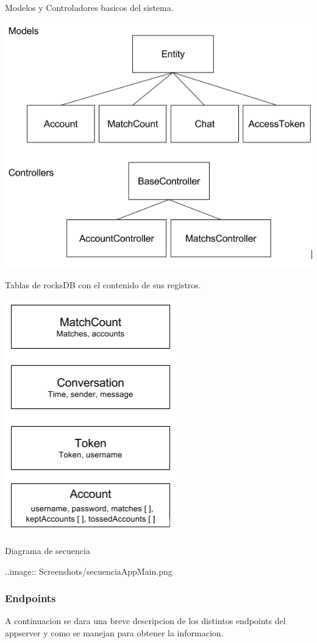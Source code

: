 \documentclass[letterpaper,10pt,english]{sphinxmanual}
\begin{document}
Modelos y Controladores basicos del sistema.

\includegraphics{classesapp.png}

Tablas de rocksDB con el contenido de sus registros.

\includegraphics{rocksdb.png}

Diagrama de secuencia

..image:: Screenshots/secuenciaAppMain.png


\subsubsection{Endpoints}
\label{manuals:endpoints}
A continuacion se dara una breve descripcion de los distintos endpoints del appserver y como se manejan para obtener la informacion.
\end{document}
